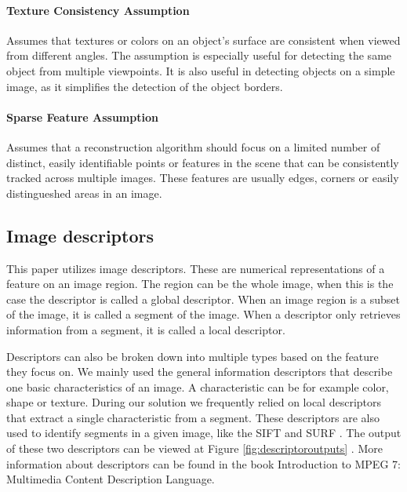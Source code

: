 \paragraph{Texture Consistency Assumption\cite{blake1990shape}} Assumes that textures or colors on an object’s surface are consistent when viewed from different angles. The assumption is especially useful for detecting the same object from multiple viewpoints. It is also useful in detecting objects on a simple image, as it simplifies the detection of the object borders.

\paragraph{Sparse Feature Assumption\cite{gui2016feature}} Assumes that a reconstruction algorithm should focus on a limited number of distinct, easily identifiable points or features in the scene that can be consistently tracked across multiple images. These features are usually edges, corners or easily distingueshed areas in an image.

\subsection{Image descriptors}
This paper utilizes image descriptors. These are numerical representations of a feature on an image region. The region can be the whole image, when this is the case the descriptor is called a global descriptor. When an image region is a subset of the image, it is called a segment of the image. When a descriptor only retrieves information from a segment, it is called a local descriptor.

Descriptors can also be broken down into multiple types based on the feature they focus on. We mainly used the general information descriptors that describe one basic characteristics of an image. A characteristic can be for example color, shape or texture. During our solution we frequently relied on local descriptors that extract a single characteristic from a segment. These descriptors are also used to identify segments in a given image, like the SIFT \cite{lowe2004distinctive} and SURF \cite{speeduprobustfeatures}. The output of these two descriptors can be viewed at Figure \ref{fig:descriptoroutputs} . More information about descriptors can be found in the book Introduction to MPEG 7: Multimedia Content Description Language\cite{manjunath2002mpeg7}.

